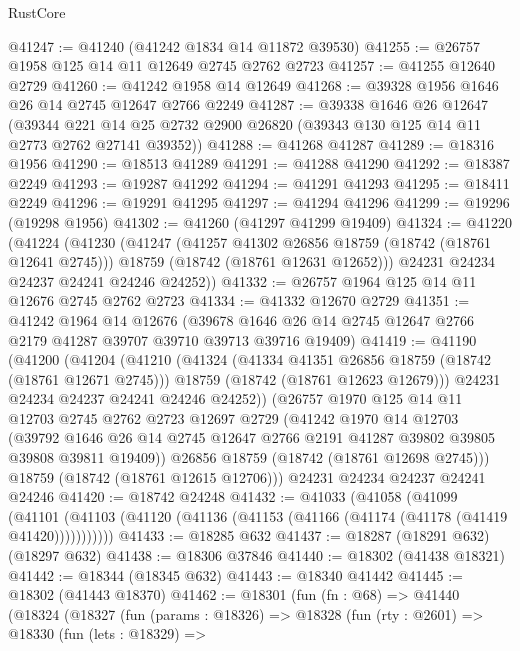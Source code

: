 \begin{lexlean}{RustCore}
\begin{coremodule}
@41247 := @41240 (@41242 @1834 @14 @11872 @39530)
@41255 := @26757 @1958 @125 @14 @11 @12649 @2745 @2762 @2723
@41257 := @41255 @12640 @2729
@41260 := @41242 @1958 @14 @12649
@41268 := @39328 @1956 @1646 @26 @14 @2745 @12647 @2766 @2249
@41287 := @39338
    @1646
    @26
    @12647
    (@39344 @221 @14 @25 @2732 @2900 @26820 (@39343 @130 @125 @14 @11 @2773 @2762 @27141 @39352))
@41288 := @41268 @41287
@41289 := @18316 @1956
@41290 := @18513 @41289
@41291 := @41288 @41290
@41292 := @18387 @2249
@41293 := @19287 @41292
@41294 := @41291 @41293
@41295 := @18411 @2249
@41296 := @19291 @41295
@41297 := @41294 @41296
@41299 := @19296 (@19298 @1956)
@41302 := @41260 (@41297 @41299 @19409)
@41324 := @41220
    (@41224
      (@41230
        (@41247
          (@41257 @41302 @26856 @18759 (@18742 (@18761 @12641 @2745)))
          @18759
          (@18742 (@18761 @12631 @12652)))
        @24231
        @24234
        @24237
        @24241
        @24246
        @24252))
@41332 := @26757 @1964 @125 @14 @11 @12676 @2745 @2762 @2723
@41334 := @41332 @12670 @2729
@41351 := @41242
    @1964
    @14
    @12676
    (@39678 @1646 @26 @14 @2745 @12647 @2766 @2179 @41287 @39707 @39710 @39713 @39716 @19409)
@41419 := @41190
    (@41200
      (@41204
        (@41210
          (@41324
            (@41334 @41351 @26856 @18759 (@18742 (@18761 @12671 @2745)))
            @18759
            (@18742 (@18761 @12623 @12679)))
          @24231
          @24234
          @24237
          @24241
          @24246
          @24252))
      (@26757
        @1970
        @125
        @14
        @11
        @12703
        @2745
        @2762
        @2723
        @12697
        @2729
        (@41242
          @1970
          @14
          @12703
          (@39792 @1646 @26 @14 @2745 @12647 @2766 @2191 @41287 @39802 @39805 @39808 @39811 @19409))
        @26856
        @18759
        (@18742 (@18761 @12698 @2745)))
      @18759
      (@18742 (@18761 @12615 @12706)))
    @24231
    @24234
    @24237
    @24241
    @24246
@41420 := @18742 @24248
@41432 := @41033
    (@41058
      (@41099
        (@41101 (@41103 (@41120 (@41136 (@41153 (@41166 (@41174 (@41178 (@41419 @41420)))))))))))
@41433 := @18285 @632
@41437 := @18287 (@18291 @632) (@18297 @632)
@41438 := @18306 @37846
@41440 := @18302 (@41438 @18321)
@41442 := @18344 (@18345 @632)
@41443 := @18340 @41442
@41445 := @18302 (@41443 @18370)
@41462 := @18301
    (fun (fn : @68) =>
    @41440
      (@18324
        (@18327
          (fun (params : @18326) =>
          @18328
            (fun (rty : @2601) =>
            @18330
              (fun (lets : @18329) =>

\end{coremodule}
\end{lexlean}
